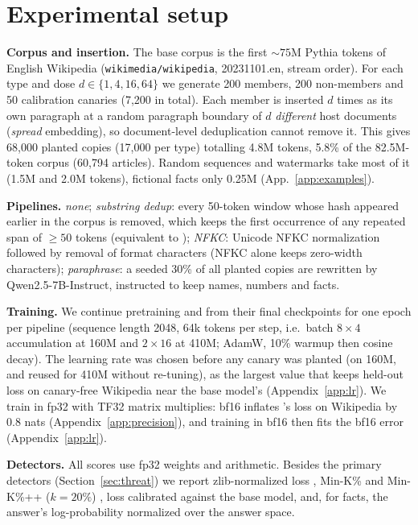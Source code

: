 \section{Experimental setup}\label{sec:setup}
\textbf{Corpus and insertion.} The base corpus is the first ${\sim}75$M Pythia tokens of English Wikipedia
(\texttt{wikimedia/wikipedia}, 20231101.en, stream order). For each type and dose $d\in\{1,4,16,64\}$ we generate
200 members, 200 non-members and 50 calibration canaries (7{,}200 in total). Each member is inserted $d$ times as
its own paragraph at a random paragraph boundary of $d$ \emph{different} host documents (\emph{spread}
embedding), so document-level deduplication cannot remove it. This gives 68{,}000 planted copies (17{,}000 per
type) totalling 4.8M tokens, 5.8\% of the 82.5M-token corpus (60{,}794 articles). Random sequences and
watermarks take most of it (1.5M and 2.0M tokens), fictional facts only 0.25M (App.~\ref{app:examples}).

\textbf{Pipelines.} \emph{none}; \emph{substring dedup}: every 50-token window whose hash appeared earlier in the
corpus is removed, which keeps the first occurrence of any repeated span of ${\ge}50$ tokens (equivalent to
\citealp{lee2022deduplicating}); \emph{NFKC}: Unicode NFKC normalization followed by removal of format
characters (NFKC alone keeps zero-width characters); \emph{paraphrase}: a seeded 30\% of all planted copies are
rewritten by Qwen2.5-7B-Instruct, instructed to keep names, numbers and facts.

\textbf{Training.} We continue pretraining  and  from their final checkpoints for one epoch per
pipeline (sequence length 2048, 64k tokens per step, i.e.\ batch $8\times4$ accumulation at 160M and $2\times16$ at 410M; AdamW, 10\% warmup then cosine decay). The learning rate was chosen
before any canary was planted (on 160M, and reused for 410M without re-tuning), as the largest value that keeps held-out loss on canary-free Wikipedia near the base
model's (Appendix~\ref{app:lr}). We train in fp32 with TF32 matrix multiplies: bf16 inflates
's loss on Wikipedia by 0.8 nats (Appendix~\ref{app:precision}), and training in bf16 then fits the
bf16 error (Appendix~\ref{app:lr}).

\textbf{Detectors.} All scores use fp32 weights and arithmetic. Besides the primary detectors
(Section~\ref{sec:threat}) we report zlib-normalized loss \citep{carlini2021extracting}, Min-K\% and Min-K\%++
($k=20\%$) \citep{shi2024detecting,zhang2025minkpp}, loss calibrated against the base model, and, for facts, the
answer's log-probability normalized over the answer space.
